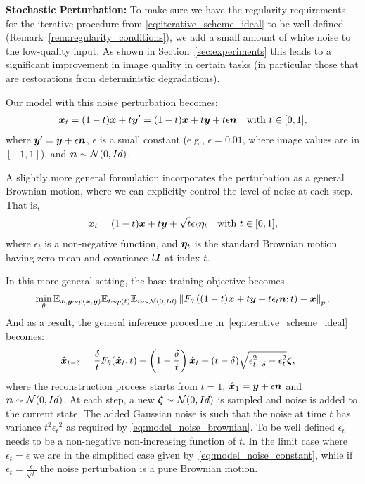 \documentclass[10pt]{article} %
\begin{document}
\noindent \textbf{Stochastic Perturbation:} To make sure we have the regularity requirements for the iterative procedure from \eqref{eq:iterative_scheme_ideal} to be well defined (Remark~\ref{rem:regularity_conditions}), we add a small amount of white noise to the low-quality input. As shown in Section~\ref{sec:experiments} this leads to a significant improvement in image quality in certain tasks (in particular those that are restorations from deterministic degradations). 

Our model with this noise perturbation becomes:
\begin{align}
{\bm{x}}_t = (1-t) {\bm{x}} + t {\bm{y}}' = (1-t) {\bm{x}} + t {\bm{y}} + t \epsilon {\bm{n}} \quad \text{with} \,\, t \in [0,1],
\label{eq:model_noise_constant}
\end{align}
where ${\bm{y}}' = {\bm{y}} + \epsilon {\bm{n}}$, $\epsilon$ is a small constant (e.g., $\epsilon=0.01$, where image values are in $[-1,1]$), and ${\bm{n}} \sim \mathcal{N}(0,Id)$.





A slightly more general formulation incorporates the perturbation as a general Brownian motion, where we can explicitly control the level of noise at each step. That is,
\begin{align}
{\bm{x}}_t = (1-t) {\bm{x}} + t {\bm{y}} + \sqrt{t} \epsilon_t {\bm{\eta}}_t \quad \text{with} \,\, t \in [0,1],
\label{eq:model_noise_brownian}
\end{align}
where $\epsilon_t$ is a non-negative function, and ${\bm{\eta}}_t$ is the standard Brownian motion having zero mean and covariance $t{\bm{I}}$ at index $t$. 

In this more general setting, the base training objective becomes
\begin{align}
\min_\theta \mathbb{E}_{{\bm{x}},{\bm{y}} \sim p({\bm{x}},{\bm{y}})} \mathbb{E}_{t\sim p(t)} \mathbb{E}_{{\bm{n}} \sim \mathcal{N}(0, Id)}\left\| F_\theta \left((1-t) {\bm{x}} + t {\bm{y}} + t\epsilon_t{\bm{n}} ; t \right) - {\bm{x}} \right\|_p.
\label{eq:full_loss}
\end{align}
And as a result, the general inference procedure in~\eqref{eq:iterative_scheme_ideal} becomes:
\begin{align}
\hat {{\bm{x}}}_{t-\delta} &= \frac{\delta}{t} F_\theta(\hat {{\bm{x}}}_t, t) + \left(1-\frac{\delta}{t} \right) \hat {{\bm{x}}}_t + (t-\delta)\sqrt{\epsilon_{t-\delta}^2 - \epsilon_t^2}{\bm{\zeta}} 
\label{eq:baseline_sampler_noise},
\end{align}
where the reconstruction process starts from $t=1$, $\hat  {{\bm{x}}}_{1} = {\bm{y}} + \epsilon {\bm{n}}$ and ${\bm{n}} \sim \mathcal{N}(0, Id)$. At each step, a new ${\bm{\zeta}} \sim \mathcal{N}(0, Id)$ is sampled and noise is added to the current state.
The added Gaussian noise is such that the noise at time $t$ has variance $t^2{\epsilon_t}^2$ as required by \eqref{eq:model_noise_brownian}. To be well defined $\epsilon_t$ needs to be a non-negative non-increasing function of $t$. In the limit case where $\epsilon_t = \epsilon$ we are in the simplified case given by~\eqref{eq:model_noise_constant}, while if $\epsilon_t = \frac{\epsilon}{\sqrt{t}}$ the noise perturbation is a pure Brownian motion. 
\end{document}
